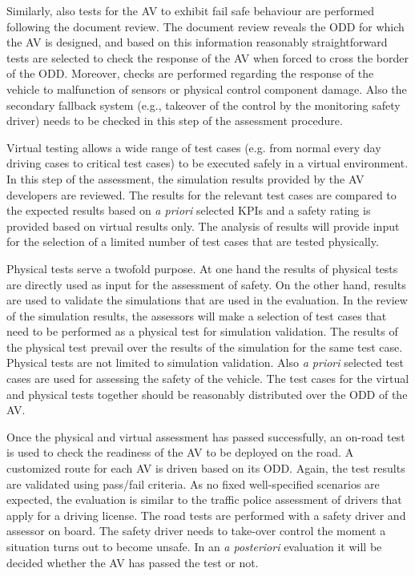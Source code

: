 Similarly, also tests for the AV to exhibit fail safe behaviour are performed following the document review. The document review reveals the ODD for which the AV is designed, and based on this information reasonably straightforward tests are selected to check the response of the AV when forced to cross the border of the ODD. Moreover, checks are performed regarding the response of the vehicle to malfunction of sensors or physical control component damage. Also the secondary fallback system (e.g., takeover of the control by the monitoring safety driver) needs to be checked in this step of the assessment procedure. 

Virtual testing allows a wide range of test cases (e.g. from normal every day driving cases to critical test cases) to be executed safely in a virtual environment. In this step of the assessment, the simulation results provided by the AV developers are reviewed. The results for the relevant test cases are compared to the expected results based on \textit{a priori} selected KPIs and a safety rating is provided based on virtual results only. The analysis of results will provide input for the selection of a limited number of test cases that are tested physically.

Physical tests serve a twofold purpose. At one hand the results of physical tests are directly used as input for the assessment of safety. On the other hand, results are used to validate the simulations that are used in the evaluation. In the review of the simulation results, the assessors will make a selection of test cases that need to be performed as a physical test for simulation validation. The results of the physical test prevail over the results of the simulation for the same test case. Physical tests are not limited to simulation validation. Also \textit{a priori} selected test cases are used for assessing the safety of the vehicle. The test cases for the virtual and physical tests together should be reasonably distributed over the ODD of the AV. 

Once the physical and virtual assessment has passed successfully, an on-road test is used to check the readiness of the AV to be deployed on the road. A customized route for each AV is driven based on its ODD. Again, the test results are validated using pass/fail criteria. As no fixed well-specified scenarios are expected, the evaluation is similar to the traffic police assessment of drivers that apply for a driving license. The road tests are performed with a safety driver and assessor on board. The safety driver needs to take-over control the moment a situation turns out to become unsafe. In an \textit{a posteriori} evaluation it will be decided whether the AV has passed the test or not.


